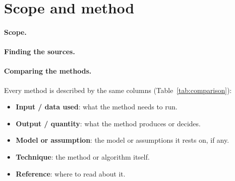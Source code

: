 \section{Scope and method}
\label{sec:method}

\paragraph{Scope.}

\paragraph{Finding the sources.}

\paragraph{Comparing the methods.}
Every method is described by the same columns (Table~\ref{tab:comparison}):

\begin{itemize}
  \item \textbf{Input / data used}: what the method needs to run.
  \item \textbf{Output / quantity}: what the method produces or decides.
  \item \textbf{Model or assumption}: the model or assumptions it rests on, if any.
  \item \textbf{Technique}: the method or algorithm itself.
  \item \textbf{Reference}: where to read about it.
\end{itemize}

\noindent {}
